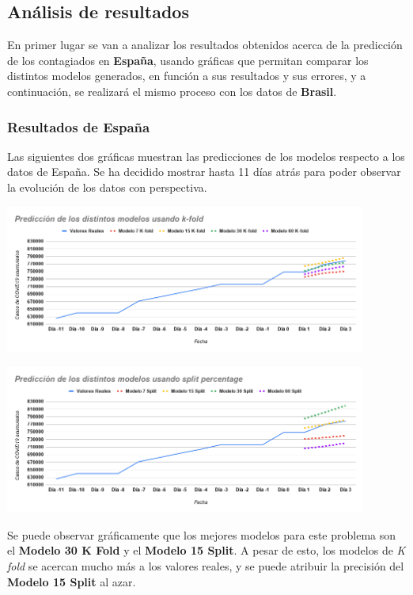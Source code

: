 \documentclass[12pt,a4paper, xcolor=table]{article}
\begin{document}
    \subsection{Análisis de resultados}

    En primer lugar se van a analizar los resultados obtenidos acerca de la predicción de los contagiados en \textbf{España}, usando gráficas que permitan comparar los distintos modelos generados, en función a sus resultados y sus errores, y a continuación, se realizará el mismo proceso con los datos de \textbf{Brasil}.

    \subsubsection{Resultados de España}

    Las siguientes dos gráficas muestran las predicciones de los modelos respecto a los datos de España. Se ha decidido mostrar hasta 11 días atrás para poder observar la evolución de los datos con perspectiva.

    \begin{center}
        \includegraphics[width=450px]{img/pred_modelos_kFold_ES.png}
    \end{center}

    \begin{center}
        \centering
        \includegraphics[width=450px]{img/pred_modelos_split_ES.png}
    \end{center}

    Se puede observar gráficamente que los mejores modelos para este problema son el \textbf{Modelo 30 K Fold} y el \textbf{Modelo 15 Split}. A pesar de esto, los modelos de \textit{K fold} se acercan mucho más a los valores reales, y se puede atribuir la precisión del \textbf{Modelo 15 Split} al azar.
\end{document}
